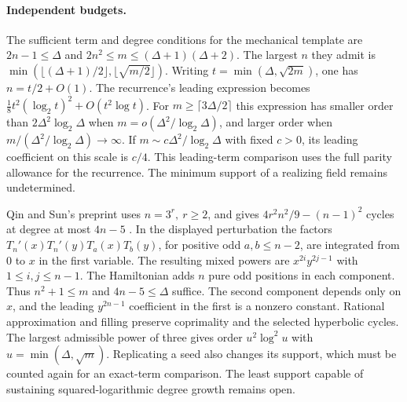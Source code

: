 \paragraph{Independent budgets.}
The sufficient term and degree conditions for the mechanical template are \(2n-1\le\Delta\) and \(2n^2\le m\le(\Delta+1)(\Delta+2)\). The largest \(n\) they admit is \(\min(\lfloor(\Delta+1)/2\rfloor,\lfloor\sqrt{m/2}\rfloor)\). Writing \(t=\min(\Delta,\sqrt{2m})\), one has \(n=t/2+O(1)\). The recurrence's leading expression becomes \(\tfrac18 t^2(\log_2t)^2+O(t^2\log t)\). For \(m\ge\lceil3\Delta/2\rceil\) this expression has smaller order than \(2\Delta^2\log_2\Delta\) when \(m=o(\Delta^2/\log_2\Delta)\), and larger order when \(m/(\Delta^2/\log_2\Delta)\to\infty\). If \(m\sim c\Delta^2/\log_2\Delta\) with fixed \(c>0\), its leading coefficient on this scale is \(c/4\). This leading-term comparison uses the full parity allowance for the recurrence. The minimum support of a realizing field remains undetermined.

Qin and Sun's preprint uses \(n=3^r,\ r\ge2\), and gives \(4r^2n^2/9-(n-1)^2\) cycles at degree at most \(4n-5\) \cite[Theorem~1.1 and {\S\S}3.2, 6.3]{QinSun2026}. In the displayed perturbation the factors \(T_n'(x)T_n'(y)T_a(x)T_b(y)\), for positive odd \(a,b\le n-2\), are integrated from 0 to \(x\) in the first variable. The resulting mixed powers are \(x^{2i}y^{2j-1}\) with \(1\le i,j\le n-1\). The Hamiltonian adds \(n\) pure odd positions in each component. Thus \(n^2+1\le m\) and \(4n-5\le\Delta\) suffice. The second component depends only on \(x\), and the leading \(y^{2n-1}\) coefficient in the first is a nonzero constant. Rational approximation and filling preserve coprimality and the selected hyperbolic cycles. The largest admissible power of three gives order \(u^2\log^2u\) with \(u=\min(\Delta,\sqrt m)\). Replicating a seed also changes its support, which must be counted again for an exact-term comparison. The least support capable of sustaining squared-logarithmic degree growth remains open.
